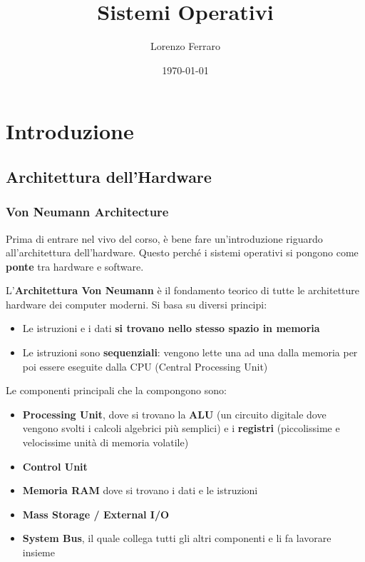 \documentclass[11pt, a4paper, titlepage, oneside]{scrbook}
\title{Sistemi Operativi}
\author{Lorenzo Ferraro}
\date{\today}
\begin{document}
\frontmatter
\SapienzaCoverItalianoTriennale
\InfoSegnalazioni

\tableofcontents

\mainmatter

\chapter{Introduzione}

\section{Architettura dell'Hardware}

\subsection{Von Neumann Architecture}

Prima di entrare nel vivo del corso, è bene fare un'introduzione riguardo all'architettura dell'hardware. Questo perché i sistemi operativi si pongono come \textbf{ponte} tra hardware e software. 

\begin{Definizione}
\label{def-von-neuman-architecture}
L'\textbf{Architettura Von Neumann} è il fondamento teorico di tutte le architetture hardware dei computer moderni. Si basa su diversi principi:
\begin{itemize}
    \item Le istruzioni e i dati \textbf{si trovano nello stesso spazio in memoria}
    \item Le istruzioni sono \textbf{sequenziali}: vengono lette una ad una dalla memoria per poi essere eseguite dalla CPU (Central Processing Unit)
\end{itemize}
Le componenti principali che la compongono sono:
\begin{itemize}
    \item \textbf{Processing Unit}, dove si trovano la \textbf{ALU} (un circuito digitale dove vengono svolti i calcoli algebrici più semplici) e i \textbf{registri} (piccolissime e velocissime unità di memoria volatile)
    \item \textbf{Control Unit}
    \item \textbf{Memoria RAM} dove si trovano i dati e le istruzioni
    \item \textbf{Mass Storage / External I/O}
    \item \textbf{System Bus}, il quale collega tutti gli altri componenti e li fa lavorare insieme
\end{itemize}
\end{Definizione}
\end{document}
